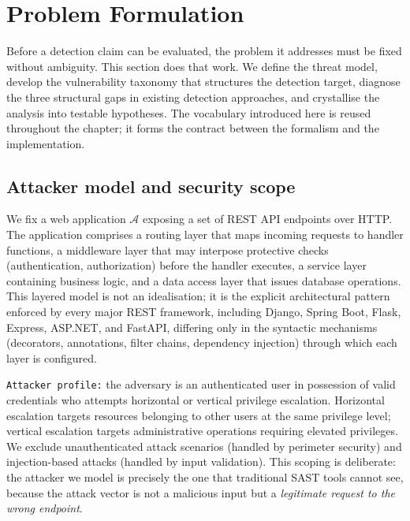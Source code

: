 \section{Problem Formulation}
\label{det:problem}

Before a detection claim can be evaluated, the problem it addresses must be
fixed without ambiguity. This section does that work. We define the threat
model, develop the vulnerability taxonomy that structures the detection
target, diagnose the three structural gaps in existing detection approaches,
and crystallise the analysis into testable hypotheses. The vocabulary
introduced here is reused throughout the chapter; it forms the contract
between the formalism and the implementation.

\subsection{Attacker model and security scope}
\label{sec:det-threat}
\textcolor{red}{}

We fix a web application $\mathcal{A}$ exposing a set of REST API endpoints
over HTTP. The application comprises a routing layer that maps incoming
requests to handler functions, a middleware layer that may interpose
protective checks (authentication, authorization) before the handler
executes, a service layer containing business logic, and a data access layer
that issues database operations. This layered model is not an idealisation;
it is the explicit architectural pattern enforced by every major REST
framework, including Django, Spring Boot, Flask, Express, ASP.NET, and
FastAPI, differing only in the syntactic mechanisms (decorators, annotations,
filter chains, dependency injection) through which each layer is configured.

\texttt{Attacker profile:} the adversary is an authenticated user in
possession of valid credentials who attempts horizontal or vertical privilege
escalation. Horizontal escalation targets resources belonging to other users
at the same privilege level; vertical escalation targets administrative
operations requiring elevated privileges. We exclude unauthenticated attack
scenarios (handled by perimeter security) and injection-based attacks
(handled by input validation). This scoping is deliberate: the attacker we
model is precisely the one that traditional SAST tools cannot see, because
the attack vector is not a malicious input but a \emph{legitimate request
to the wrong endpoint}.

